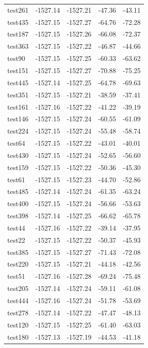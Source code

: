 \documentclass[journal=jacsat,manuscript=article]{achemso}
\begin{document}
\begin{table}[b!]
\begin{tabular}{lrrrr}
test261 &  -1527.14 &  -1527.21 &  -47.36 &  -43.11 \\
test435 &  -1527.15 &  -1527.27 &  -64.76 &  -72.28 \\
test187 &  -1527.15 &  -1527.26 &  -66.08 &  -72.37 \\
test363 &  -1527.15 &  -1527.22 &  -46.87 &  -44.66 \\
test90  &  -1527.15 &  -1527.25 &  -60.33 &  -63.62 \\
test151 &  -1527.15 &  -1527.27 &  -70.88 &  -75.25 \\
test445 &  -1527.14 &  -1527.25 &  -64.78 &  -69.63 \\
test351 &  -1527.15 &  -1527.21 &  -38.59 &  -37.41 \\
test161 &  -1527.16 &  -1527.22 &  -41.22 &  -39.19 \\
test146 &  -1527.15 &  -1527.24 &  -60.55 &  -61.09 \\
test224 &  -1527.15 &  -1527.24 &  -55.48 &  -58.74 \\
test64  &  -1527.15 &  -1527.22 &  -43.01 &  -40.01 \\
test430 &  -1527.15 &  -1527.24 &  -52.65 &  -56.60 \\
test159 &  -1527.15 &  -1527.22 &  -50.36 &  -45.30 \\
test61  &  -1527.15 &  -1527.23 &  -44.70 &  -52.86 \\
test485 &  -1527.14 &  -1527.24 &  -61.35 &  -63.24 \\
test400 &  -1527.15 &  -1527.24 &  -56.66 &  -53.63 \\
test398 &  -1527.14 &  -1527.25 &  -66.62 &  -65.78 \\
test44  &  -1527.16 &  -1527.22 &  -39.14 &  -37.95 \\
test22  &  -1527.15 &  -1527.22 &  -50.37 &  -45.93 \\
test385 &  -1527.15 &  -1527.27 &  -71.43 &  -72.08 \\
test220 &  -1527.15 &  -1527.21 &  -44.18 &  -42.56 \\
test51  &  -1527.16 &  -1527.28 &  -69.24 &  -75.48 \\
test205 &  -1527.14 &  -1527.24 &  -59.11 &  -61.08 \\
test444 &  -1527.16 &  -1527.24 &  -51.78 &  -53.69 \\
test278 &  -1527.14 &  -1527.22 &  -47.47 &  -48.13 \\
test120 &  -1527.15 &  -1527.25 &  -61.40 &  -63.03 \\
test180 &  -1527.13 &  -1527.19 &  -44.53 &  -41.18 \\

\end{tabular}
\end{table}
\end{document}

